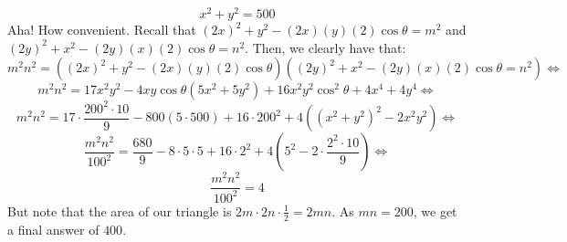 \begin{enumerate}
 \[x^2 + y^2 = 500\]Aha! How convenient. Recall that $(2x)^2 + y^2 - (2x)(y)(2)\cos \theta = m^2$ and $(2y)^2+x^2-(2y)(x)(2)\cos \theta = n^2$. Then, we clearly have that:
 \[m^2n^2 = ((2x)^2 + y^2 - (2x)(y)(2)\cos \theta)((2y)^2+x^2-(2y)(x)(2)\cos \theta = n^2) \Longleftrightarrow\]
 \[m^2n^2 = 17x^2y^2 - 4xy \cos \theta (5x^2 + 5y^2) + 16x^2y^2 \cos ^2 \theta + 4x^4 + 4y^4 \Longleftrightarrow\]
 \[m^2n^2 = 17 \cdot \frac{200^2 \cdot 10}{9} - 800(5 \cdot 500) + 16 \cdot 200^2 + 4 \left( (x^2+y^2)^2-2x^2y^2\right) \Longleftrightarrow\]
 \[\frac{m^2n^2}{100^2} = \frac{680}{9} - 8 \cdot 5 \cdot 5 + 16 \cdot 2^2 + 4 \left( 5^2 - 2 \cdot \frac{2^2 \cdot 10}{9}\right) \Longleftrightarrow\]
 \[\frac{m^2n^2}{100^2} = 4\]But note that the area of our triangle is $2m \cdot 2n \cdot \frac {1}{2} = 2mn$. As $mn = 200$, we get a final answer of $\boxed{400}$.

 


\end{enumerate}